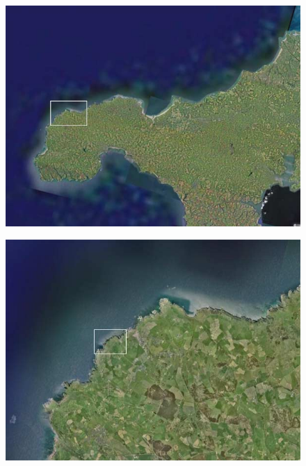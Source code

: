 \documentclass[12pt]{article}
\begin{document}
\begin{figure}[H]
    \centering
    \begin{minipage}[b]{0.5\textwidth}
        \centering
        \includegraphics[width=\textwidth]{assets/uk2.jpg}
        \label{fig:uk2}
    \end{minipage}
    \hspace{0.05\textwidth} %
    \begin{minipage}[b]{0.5\textwidth}
        \centering
        \includegraphics[width=\textwidth]{assets/uk3.jpg}
        \label{fig:uk3}
    \end{minipage}
    \hspace{0.05\textwidth} %

\end{figure}
\end{document}
